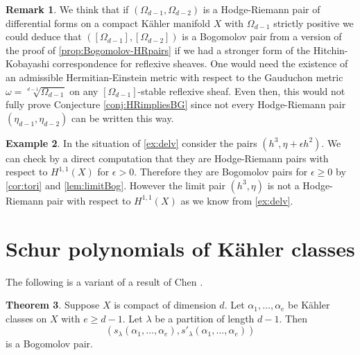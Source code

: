 \documentclass[a4,reqno]{amsart}
\theoremstyle{definition}
\newtheorem{theorem}{Theorem}[section]
\newtheorem{remark}[theorem]{Remark}
\newtheorem{example}[theorem]{Example}
\numberwithin{equation}{section}
\begin{document}
\begin{remark}
We think that if $(\Omega_{d-1},\Omega_{d-2})$ is a Hodge-Riemann pair of differential forms on a compact K\"ahler manifold $X$ with $\Omega_{d-1}$ strictly positive we could deduce that $([\Omega_{d-1}],[\Omega_{d-2}])$ is a Bogomolov pair from a version of the proof of \cref{prop:Bogomolov-HRpairs} if we had a stronger form of the Hitchin-Kobayashi correspondence for reflexive sheaves.  One would need the existence of an admissible Hermitian-Einstein metric with respect to the Gauduchon metric $\omega = \sqrt[d-1]{\Omega_{d-1}}$ on any $[\Omega_{d-1}]$-stable reflexive sheaf.  Even then, this would not fully prove Conjecture \ref{conj:HRimpliesBG} since not every Hodge-Riemann pair $(\eta_{d-1},\eta_{d-2})$ can be written this way.
\end{remark}

\begin{example}\label{ex:nonHRlimit}
    In the situation of \cref{ex:delv} consider the pairs $(h^3,\eta+\epsilon h^2)$. We can check by a direct computation that they are Hodge-Riemann pairs with respect to $H^{1,1}(X)$ for $\epsilon>0$. Therefore they are Bogomolov pairs for $\epsilon\ge0$ by \cref{cor:tori} and \cref{lem:limitBog}. However the limit pair $(h^3,\eta)$ is not a Hodge-Riemann pair with respect to $H^{1,1}(X)$ as we know from \cref{ex:delv}. 
\end{example}



\section{Schur polynomials of K\"ahler classes}\label{sec:SchurPoly}


The following is a variant of a result of Chen \cite{Chen}.


\begin{theorem}\label{thm:HRimpliesBG}
Suppose $X$ is compact of dimension $d$.  Let $\alpha_1,\ldots,\alpha_e$ be K\"ahler classes on $X$ with $e\ge d-1$.  Let $\lambda$ be a partition of length $d-1$.  Then 
$$(s_{\lambda}(\alpha_1,\ldots,\alpha_e),s'_{\lambda}(\alpha_1,\ldots,\alpha_e))$$
is a Bogomolov pair. 
\end{theorem}
\end{document}
